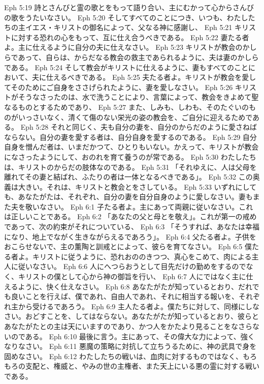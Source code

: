 Eph 5:19  詩とさんびと霊の歌とをもって語り合い、主にむかって心からさんびの歌をうたいなさい。
Eph 5:20  そしてすべてのことにつき、いつも、わたしたちの主イエス・キリストの御名によって、父なる神に感謝し、
Eph 5:21  キリストに対する恐れの心をもって、互に仕え合うべきである。
Eph 5:22  妻たる者よ。主に仕えるように自分の夫に仕えなさい。
Eph 5:23  キリストが教会のかしらであって、自らは、からだなる教会の救主であられるように、夫は妻のかしらである。
Eph 5:24  そして教会がキリストに仕えるように、妻もすべてのことにおいて、夫に仕えるべきである。
Eph 5:25  夫たる者よ。キリストが教会を愛してそのためにご自身をささげられたように、妻を愛しなさい。
Eph 5:26  キリストがそうなさったのは、水で洗うことにより、言葉によって、教会をきよめて聖なるものとするためであり、
Eph 5:27  また、しみも、しわも、そのたぐいのものがいっさいなく、清くて傷のない栄光の姿の教会を、ご自分に迎えるためである。
Eph 5:28  それと同じく、夫も自分の妻を、自分のからだのように愛さねばならない。自分の妻を愛する者は、自分自身を愛するのである。
Eph 5:29  自分自身を憎んだ者は、いまだかつて、ひとりもいない。かえって、キリストが教会になさったようにして、おのれを育て養うのが常である。
Eph 5:30  わたしたちは、キリストのからだの肢体なのである。
Eph 5:31  「それゆえに、人は父母を離れてその妻と結ばれ、ふたりの者は一体となるべきである」。
Eph 5:32  この奥義は大きい。それは、キリストと教会とをさしている。
Eph 5:33  いずれにしても、あなたがたは、それぞれ、自分の妻を自分自身のように愛しなさい。妻もまた夫を敬いなさい。
Eph 6:1  子たる者よ。主にあって両親に従いなさい。これは正しいことである。
Eph 6:2  「あなたの父と母とを敬え」。これが第一の戒めであって、次の約束がそれについている、
Eph 6:3  「そうすれば、あなたは幸福になり、地上でながく生きながらえるであろう」。
Eph 6:4  父たる者よ。子供をおこらせないで、主の薫陶と訓戒とによって、彼らを育てなさい。
Eph 6:5  僕たる者よ。キリストに従うように、恐れおののきつつ、真心をこめて、肉による主人に従いなさい。
Eph 6:6  人にへつらおうとして目先だけの勤めをするのでなく、キリストの僕として心から神の御旨を行い、
Eph 6:7  人にではなく主に仕えるように、快く仕えなさい。
Eph 6:8  あなたがたが知っているとおり、だれでも良いことを行えば、僕であれ、自由人であれ、それに相当する報いを、それぞれ主から受けるであろう。
Eph 6:9  主人たる者よ。僕たちに対して、同様にしなさい。おどすことを、してはならない。あなたがたが知っているとおり、彼らとあなたがたとの主は天にいますのであり、かつ人をかたより見ることをなさらないのである。
Eph 6:10  最後に言う。主にあって、その偉大な力によって、強くなりなさい。
Eph 6:11  悪魔の策略に対抗して立ちうるために、神の武具で身を固めなさい。
Eph 6:12  わたしたちの戦いは、血肉に対するものではなく、もろもろの支配と、権威と、やみの世の主権者、また天上にいる悪の霊に対する戦いである。
